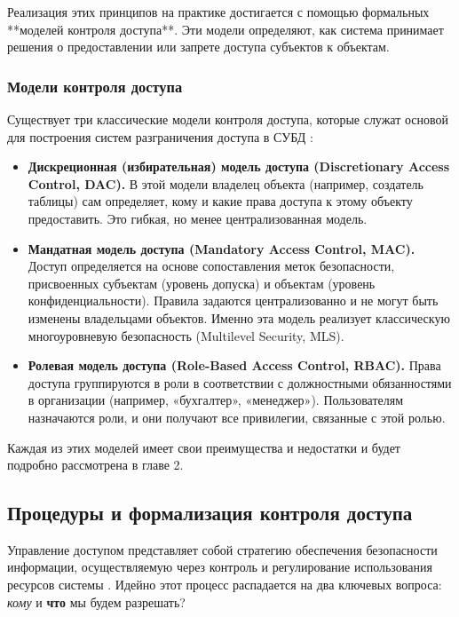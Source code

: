 Реализация этих принципов на практике достигается с помощью формальных **моделей контроля доступа**. Эти модели определяют, как система принимает решения о предоставлении или запрете доступа субъектов к объектам.

\subsubsection{Модели контроля доступа}
Существует три классические модели контроля доступа, которые служат основой для построения систем разграничения доступа в СУБД \autocite{Tanenbaum}:
\begin{itemize}
    \item \textbf{Дискреционная (избирательная) модель доступа (Discretionary Access Control, DAC).} В этой модели владелец объекта (например, создатель таблицы) сам определяет, кому и какие права доступа к этому объекту предоставить. Это гибкая, но менее централизованная модель.
    \item \textbf{Мандатная модель доступа (Mandatory Access Control, MAC).} Доступ определяется на основе сопоставления меток безопасности, присвоенных субъектам (уровень допуска) и объектам (уровень конфиденциальности). Правила задаются централизованно и не могут быть изменены владельцами объектов. Именно эта модель реализует классическую многоуровневую безопасность (Multilevel Security, MLS).
    \item \textbf{Ролевая модель доступа (Role-Based Access Control, RBAC).} Права доступа группируются в роли в соответствии с должностными обязанностями в организации (например, «бухгалтер», «менеджер»). Пользователям назначаются роли, и они получают все привилегии, связанные с этой ролью.
\end{itemize}
Каждая из этих моделей имеет свои преимущества и недостатки и будет подробно рассмотрена в главе 2.

\subsection{Процедуры и формализация контроля доступа}
Управление доступом представляет собой стратегию обеспечения безопасности информации, осуществляемую через контроль и регулирование использования ресурсов системы \autocite[с. 36]{Skakun}. Идейно этот процесс распадается на два ключевых вопроса: \textit{кому} и \textbf{что} мы будем разрешать?

